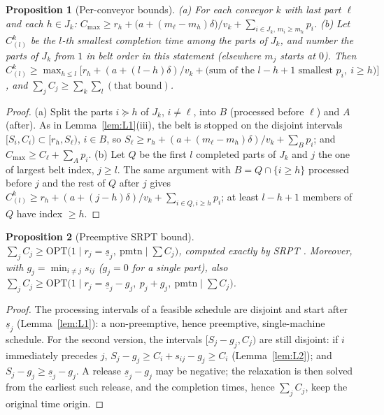 \documentclass[11pt,a4paper]{article}
\theoremstyle{plain}
\newtheorem{proposition}{Proposition}
\theoremstyle{definition}
\theoremstyle{remark}
\begin{document}
\begin{proposition}[Per-conveyor bounds]\label{prop:L4}
(a) For each conveyor $k$ with last part $\ell$ and each $h\in J_k$:
$C_{\max}\ge r_h+\bigl(a+(m_\ell-m_h)\delta\bigr)/v_k+\sum_{i\in J_k,\,m_i\ge m_h}p_i$.
(b) Let $C^k_{(l)}$ be the $l$-th smallest completion time among the parts of $J_k$, and
number the parts of $J_k$ from $1$ in belt order in this statement (elsewhere $m_j$ starts
at $0$). Then
$C^k_{(l)}\ge\max_{h\le l}\bigl[r_h+(a+(l-h)\delta)/v_k+\text{(sum of the }l-h+1\text{ smallest }p_i,\ i\ge h)\bigr]$,
and $\sum_jC_j\ge\sum_k\sum_l(\text{that bound})$.
\end{proposition}
\begin{proof}
(a) Split the parts $i\succeq h$ of $J_k$, $i\ne\ell$, into $B$ (processed before $\ell$)
and $A$ (after). As in Lemma~\ref{lem:L1}(iii), the belt is stopped on the disjoint
intervals $[S_i,C_i)\subset[r_h,S_\ell)$, $i\in B$, so
$S_\ell\ge r_h+(a+(m_\ell-m_h)\delta)/v_k+\sum_Bp_i$; and $C_{\max}\ge C_\ell+\sum_Ap_i$.
(b) Let $Q$ be the first $l$ completed parts of $J_k$ and $j$ the one of largest belt
index, $j\ge l$. The same argument with $B=Q\cap\{i\ge h\}$ processed before $j$ and the
rest of $Q$ after $j$ gives $C^k_{(l)}\ge r_h+(a+(j-h)\delta)/v_k+\sum_{i\in Q,i\ge h}p_i$;
at least $l-h+1$ members of $Q$ have index $\ge h$.
\end{proof}

\begin{proposition}[Preemptive SRPT bound]\label{prop:L5}
$\sum_jC_j\ge\mathrm{OPT}\bigl(1\mid r_j{=}\underline s_j,\ \mathrm{pmtn}\mid\sum C_j\bigr)$,
computed exactly by SRPT \cite{Schrage1968,Baker1974}. Moreover, with
$g_j=\min_{i\ne j}s_{ij}$ ($g_j=0$ for a single part), also
$\sum_jC_j\ge\mathrm{OPT}\bigl(1\mid r_j{=}\underline s_j-g_j,\ p_j{+}g_j,\ \mathrm{pmtn}\mid\sum C_j\bigr)$.
\end{proposition}
\begin{proof}
The processing intervals of a feasible schedule are disjoint and start after
$\underline s_j$ (Lemma~\ref{lem:L1}): a non-preemptive, hence preemptive, single-machine
schedule. For the second version, the intervals $[S_j-g_j,C_j)$ are still disjoint: if $i$
immediately precedes $j$, $S_j-g_j\ge C_i+s_{ij}-g_j\ge C_i$ (Lemma~\ref{lem:L2}); and
$S_j-g_j\ge\underline s_j-g_j$. A release $\underline s_j-g_j$ may be negative; the
relaxation is then solved from the earliest such release, and the completion times, hence
$\sum_jC_j$, keep the original time origin.
\end{proof}
\end{document}
